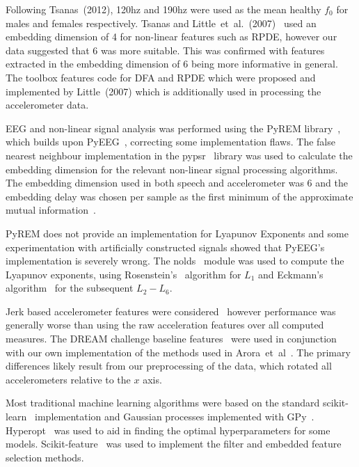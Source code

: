 \documentclass[12pt, twoside]{book}
\begin{document}
Following Tsanas~(2012), 120hz and 190hz were used as the mean healthy $f_0$ for males and females respectively. Tsanas and Little~et~al.~(2007)~\cite{splittlenonlinear2007} used an embedding dimension of 4 for non-linear features such as RPDE, however our data suggested that 6 was more suitable. This was confirmed with features extracted in the embedding dimension of 6 being more informative in general. The toolbox features code for DFA and RPDE which were proposed and implemented by Little~(2007) which is additionally used in processing the accelerometer data.

EEG and non-linear signal analysis was performed using the PyREM library~\cite{pyrem}, which builds upon PyEEG~\cite{pyeeg}, correcting some implementation flaws. The false nearest neighbour implementation in the pypsr~\cite{pypsr} library was used to calculate the embedding dimension for the relevant non-linear signal processing algorithms. The embedding dimension used in both speech and accelerometer was 6 and the embedding delay was chosen per sample as the first minimum of the approximate mutual information~\cite{rosenstein1993practicallyapunov}.
 
PyREM does not provide an implementation for Lyapunov Exponents and some experimentation with artificially constructed signals showed that PyEEG's implementation is severely wrong. The nolds~\cite{nolds} module was used to compute the Lyapunov exponents, using Rosenstein's~\cite{rosenstein1993practicallyapunov} algorithm for $L_1$ and Eckmann's algorithm~\cite{eckmann1986liapunov} for the subsequent $L_2 - L_6$.
  
Jerk based accelerometer features were considered~\cite{jerkfeature} however performance was generally worse than using the raw acceleration features over all computed measures. The DREAM challenge baseline features~\cite{mpowertools} were used in conjunction with our own implementation of the methods used in Arora~et~al~\cite{arora2014high}. The primary differences likely result from our preprocessing of the data, which rotated all accelerometers relative to the $x$ axis.


Most traditional machine learning algorithms were based on the standard scikit-learn~\cite{scikitlearn} implementation and Gaussian processes implemented with GPy~\cite{gpy2014}. Hyperopt~\cite{hyperopt} was used to aid in finding the optimal hyperparameters for some models. Scikit-feature~\cite{skfeature} was used to implement the filter and embedded feature selection methods. 
\end{document}
